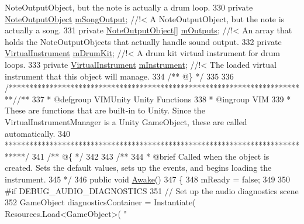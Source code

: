 \begin{DoxyCodeInclude}
{       NoteOutputObject, but the note is actually a drum loop.}
330 \textcolor{comment}{}    \textcolor{keyword}{private} \hyperlink{class_note_output_object}{NoteOutputObject}           \hyperlink{group___v_i_m_priv_gaa8d4f5642f5ac4dca4f4178b0052c78d}{mSongOutput}; \textcolor{comment}{//!< A NoteOutputObject, but
       the note is actually a song.}
331 \textcolor{comment}{}    \textcolor{keyword}{private} \hyperlink{class_note_output_object}{NoteOutputObject}[]         \hyperlink{group___v_i_m_priv_ga53f837fd01475fa35629a650e7fa00e3}{mOutputs}; \textcolor{comment}{//!< An array that holds the
       NoteOutputObjects that actually handle sound output.}
332 \textcolor{comment}{}    \textcolor{keyword}{private} \hyperlink{class_virtual_instrument}{VirtualInstrument}          \hyperlink{group___v_i_m_priv_ga0bc7c9f776b0d2dae0ccb1f1ee5f2143}{mDrumKit}; \textcolor{comment}{//!< A drum kit virtual
       instrument for drum loops.}
333 \textcolor{comment}{}    \textcolor{keyword}{private} \hyperlink{class_virtual_instrument}{VirtualInstrument}          \hyperlink{group___v_i_m_priv_gaed435d1f9be09864846db4322dc21fd1}{mInstrument}; \textcolor{comment}{//!< The loaded virtual
       instrument that this object will manage.}
334 \textcolor{comment}{}\textcolor{comment}{    /** @\} */}
335 
336     \textcolor{comment}{/*************************************************************************/}\textcolor{comment}{/** }
337 \textcolor{comment}{    * @defgroup VIMUnity Unity Functions}
338 \textcolor{comment}{    * @ingroup VIM}
339 \textcolor{comment}{    * These are functions that are built-in to Unity. Since the VirtualInstrumentManager is a Unity
       GameObject, these are called automatically.}
340 \textcolor{comment}{    *****************************************************************************/}\textcolor{comment}{}
341 \textcolor{comment}{    /** @\{ */}
342 \textcolor{comment}{}
343 \textcolor{comment}{    /**}
344 \textcolor{comment}{     * @brief Called when the object is created. Sets the default values, sets up the events, and begins
       loading the instrument.}
345 \textcolor{comment}{    */}
346     \textcolor{keyword}{public} \textcolor{keywordtype}{void} \hyperlink{group___v_i_m_unity_gab92bac4e22476ffe39fc40f49fbd6ae5}{Awake}()
347     \{
348         mReady = \textcolor{keyword}{false};
349 
350 \textcolor{preprocessor}{        #if DEBUG\_AUDIO\_DIAGNOSTICS}
351             \textcolor{comment}{// Set up the audio diagnostics scene}
352             GameObject diagnosticsContainer = Instantiate( Resources.Load<GameObject>( \textcolor{stringliteral}{"
}
\end{DoxyCodeInclude}
